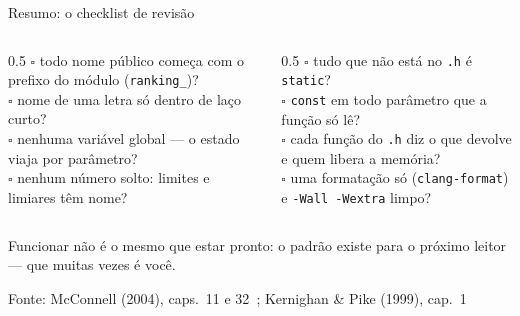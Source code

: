 \documentclass[aspectratio=169]{beamer}
\newcommand{\fonte}[1]{\vfill\hfill{\scriptsize\textcolor{UFSGray}{Fonte: #1}}}
\begin{document}
\begin{frame}{Resumo: o checklist de revisão}
  \begin{columns}[T]
    \begin{column}{0.5\textwidth}
      \small
      $\square$ todo nome público começa com o prefixo do módulo
        (\texttt{ranking\_})?\\[0.35em]
      $\square$ nome de uma letra só dentro de laço curto?\\[0.35em]
      $\square$ nenhuma variável global --- o estado viaja por
        parâmetro?\\[0.35em]
      $\square$ nenhum número solto: limites e limiares têm nome?
    \end{column}
    \begin{column}{0.5\textwidth}
      \small
      $\square$ tudo que não está no \texttt{.h} é \texttt{static}?\\[0.35em]
      $\square$ \texttt{const} em todo parâmetro que a função só lê?\\[0.35em]
      $\square$ cada função do \texttt{.h} diz o que devolve e quem
        libera a memória?\\[0.35em]
      $\square$ uma formatação só (\texttt{clang-format}) e
        \texttt{-Wall -Wextra} limpo?
    \end{column}
  \end{columns}
  \begin{block}{}
    \small Funcionar não é o mesmo que estar pronto: o padrão existe para o
    próximo leitor --- que muitas vezes é você.
  \end{block}
  \fonte{McConnell (2004), caps.~11 e 32~\cite{mcconnell2004code}; Kernighan \& Pike (1999), cap.~1~\cite{kernighan1999practice}}
\end{frame}
\end{document}
